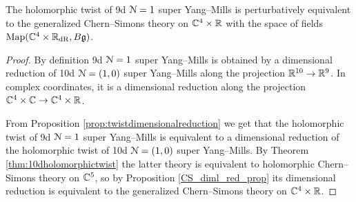 \documentclass[10pt, oneside]{article}
\begin{document}
\begin{thm}
\label{9d_twist_thm}
The holomorphic twist of 9d $\mathcal{N}=1$ super Yang--Mills is perturbatively equivalent to the generalized Chern--Simons theory on $\mathbb C^4\times \mathbb R$ with the space of fields $\operatorname{Map}(\mathbb C^4\times \mathbb R_{\mathrm{dR}}, B\mathfrak{g})$.
\end{thm}
\begin{proof}
By definition 9d $\mathcal{N}=1$ super Yang--Mills is obtained by a dimensional reduction of 10d $\mathcal{N}=(1, 0)$ super Yang--Mills along the projection $\mathbb R^{10}\rightarrow \mathbb R^9$. In complex coordinates, it is a dimensional reduction along the projection $\mathbb C^4\times \mathbb C\rightarrow \mathbb C^4\times \mathbb R$.

From Proposition \ref{prop:twistdimensionalreduction} we get that the holomorphic twist of 9d $\mathcal{N}=1$ super Yang--Mills is equivalent to a dimensional reduction of the holomorphic twist of 10d $\mathcal{N}=(1, 0)$ super Yang--Mills. By Theorem \ref{thm:10dholomorphictwist} the latter theory is equivalent to holomorphic Chern--Simons theory on $\mathbb C^5$, so by Proposition \ref{CS_diml_red_prop} its dimensional reduction is equivalent to the generalized Chern--Simons theory on $\mathbb C^4\times \mathbb R$.
\end{proof}
\end{document}
